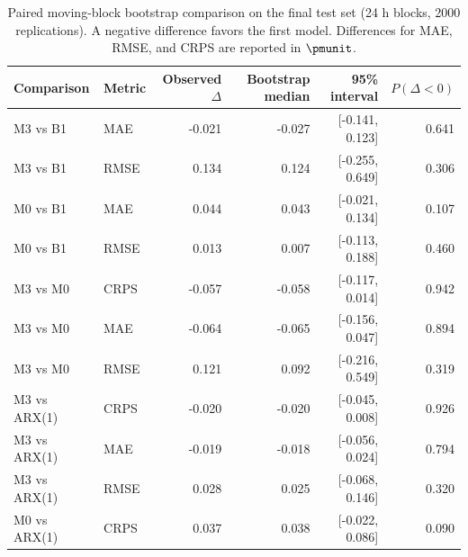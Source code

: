 \begin{table}[H]
\caption{Paired moving-block bootstrap comparison on the final test set (24 h blocks, 2000 replications). A negative difference favors the first model. {Differences for MAE, RMSE, and CRPS are reported in $\pmunit$.}\label{tab:bootstrap-comparisons}}
\centering
\scriptsize
\begin{tabular}{llrrrr}
\toprule
\textbf{Comparison} & \textbf{Metric} & \textbf{Observed $\Delta$} & \textbf{Bootstrap median} & \textbf{95\% interval} & \textbf{$P(\Delta<0)$}\\
\midrule
M3 vs B1 & MAE & -0.021 & -0.027 & [-0.141, 0.123] & 0.641\\
M3 vs B1 & RMSE & 0.134 & 0.124 & [-0.255, 0.649] & 0.306\\
M0 vs B1 & MAE & 0.044 & 0.043 & [-0.021, 0.134] & 0.107\\
M0 vs B1 & RMSE & 0.013 & 0.007 & [-0.113, 0.188] & 0.460\\
M3 vs M0 & CRPS & -0.057 & -0.058 & [-0.117, 0.014] & 0.942\\
M3 vs M0 & MAE & -0.064 & -0.065 & [-0.156, 0.047] & 0.894\\
M3 vs M0 & RMSE & 0.121 & 0.092 & [-0.216, 0.549] & 0.319\\
M3 vs {ARX(1)} & CRPS & -0.020 & -0.020 & [-0.045, 0.008] & 0.926\\
M3 vs {ARX(1)} & MAE & -0.019 & -0.018 & [-0.056, 0.024] & 0.794\\
M3 vs {ARX(1)} & RMSE & 0.028 & 0.025 & [-0.068, 0.146] & 0.320\\
M0 vs {ARX(1)} & CRPS & 0.037 & 0.038 & [-0.022, 0.086] & 0.090\\
\bottomrule
\end{tabular}
\end{table}
